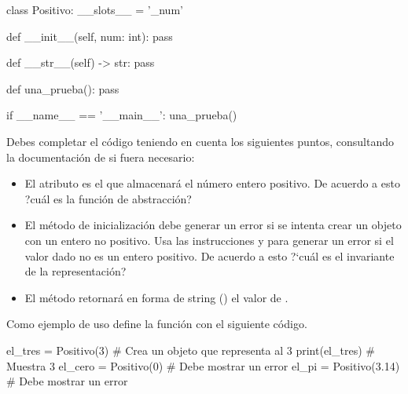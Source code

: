 \begin{pyverbatim}[][frame=single]
class Positivo:
    __slots__ = '_num'

    def __init__(self, num: int):
        pass

    def __str__(self) -> str:
        pass

def una_prueba():
    pass
          
if __name__ == '__main__':
    una_prueba()
\end{pyverbatim}

Debes completar el código teniendo en cuenta los siguientes puntos, consultando la documentación de  si fuera necesario:

\begin{itemize}
\item El atributo  es el que almacenará el número entero positivo. De acuerdo a esto ?cuál es la función de abstracción? 

\item El método de inicialización  debe generar un error si se intenta crear un objeto con un entero no positivo. Usa las instrucciones  y  para generar un error si el valor dado no es un entero positivo.  De acuerdo a esto ?`cuál es el invariante de la representación?

\item El método  retornará en forma de string () el valor de .
\end{itemize}



%
%


Como ejemplo de uso define la función  con el siguiente código.

\begin{pyverbatim}[][frame=single]
el_tres = Positivo(3)    # Crea un objeto que representa al 3
print(el_tres)           # Muestra 3
el_cero = Positivo(0)    # Debe mostrar un error
el_pi = Positivo(3.14)   # Debe mostrar un error
\end{pyverbatim}



